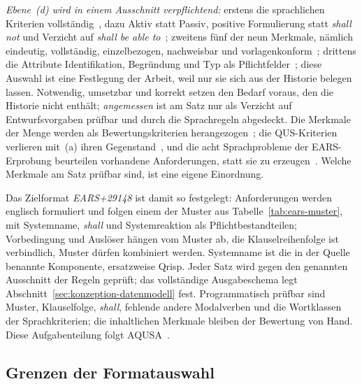 \documentclass[11pt,a4paper]{report}
\begin{document}
\emph{Ebene~(d) wird in einem Ausschnitt verpflichtend:} erstens die
sprachlichen Kriterien vollständig~\cite[Abschn.~5.2.7]{iso29148},
dazu Aktiv statt Passiv, positive Formulierung statt \emph{shall not}
und Verzicht auf \emph{shall be able to}~\cite[Abschn.~5.2.4]{iso29148};
zweitens fünf der neun Merkmale, nämlich eindeutig, vollständig,
einzelbezogen, nachweisbar und vorlagenkonform~\cite[Abschn.~5.2.5]{iso29148};
drittens die Attribute Identifikation, Begründung und Typ als
Pflichtfelder~\cite[Abschn.~5.2.8.2]{iso29148}; diese Auswahl ist eine
Festlegung der Arbeit, weil nur sie sich aus der Historie belegen
lassen. Notwendig, umsetzbar
und korrekt setzen den Bedarf voraus, den die Historie nicht enthält;
\emph{angemessen} ist am Satz nur als Verzicht auf Entwurfsvorgaben
prüfbar und durch die Sprachregeln abgedeckt. Die Merkmale der Menge
werden als Bewertungskriterien herangezogen~\cite[Abschn.~5.2.6]{iso29148};
die QUS-Kriterien verlieren mit~(a) ihren
Gegenstand~\cite[Abschn.~3]{lucassen2016qus}, und die acht
Sprachprobleme der EARS-Erprobung beurteilen vorhandene Anforderungen,
statt sie zu erzeugen~\cite[Abschn.~Testing the
Hypothesis]{mavin2010bigears}. Welche Merkmale am Satz prüfbar sind, ist
eine eigene Einordnung.

Das Zielformat \emph{EARS+29148} ist damit so festgelegt: Anforderungen
werden englisch formuliert und folgen einem der Muster aus
Tabelle~\ref{tab:ears-muster}, mit Systemname, \emph{shall} und
Systemreaktion als Pflichtbestandteilen; Vorbedingung und Auslöser
hängen vom Muster ab, die Klauselreihenfolge ist verbindlich, Muster
dürfen kombiniert werden. Systemname ist die in der Quelle benannte
Komponente, ersatzweise Qrisp. Jeder Satz wird gegen den genannten
Ausschnitt der Regeln geprüft; das vollständige Ausgabeschema legt
Abschnitt~\ref{sec:konzeption-datenmodell} fest. Programmatisch prüfbar
sind Muster, Klauselfolge, \emph{shall}, fehlende andere Modalverben und
die Wortklassen der Sprachkriterien; die inhaltlichen Merkmale bleiben
der Bewertung von Hand. Diese Aufgabenteilung folgt
AQUSA~\cite[Abschn.~4]{lucassen2016qus}.

\subsection{Grenzen der Formatauswahl}
\label{subsec:formatauswahl-grenzen}
\end{document}
